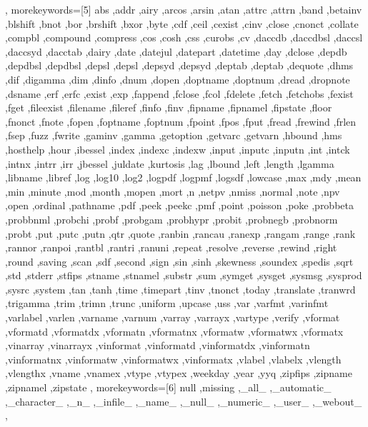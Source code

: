 {{  },
  morekeywords=[5]{
    abs ,addr ,airy ,arcos ,arsin ,atan ,attrc ,attrn ,band ,betainv
    ,blshift ,bnot ,bor ,brshift ,bxor ,byte ,cdf ,ceil ,cexist ,cinv
    ,close ,cnonct ,collate ,compbl ,compound ,compress ,cos ,cosh ,css
    ,curobs ,cv ,daccdb ,daccdbsl ,daccsl ,daccsyd ,dacctab ,dairy
    ,date ,datejul ,datepart ,datetime ,day ,dclose ,depdb ,depdbsl
    ,depdbsl ,depsl ,depsl ,depsyd ,depsyd ,deptab ,deptab ,dequote
    ,dhms ,dif ,digamma ,dim ,dinfo ,dnum ,dopen ,doptname ,doptnum
    ,dread ,dropnote ,dsname ,erf ,erfc ,exist ,exp ,fappend ,fclose
    ,fcol ,fdelete ,fetch ,fetchobs ,fexist ,fget ,fileexist ,filename
    ,fileref ,finfo ,finv ,fipname ,fipnamel ,fipstate ,floor ,fnonct
    ,fnote ,fopen ,foptname ,foptnum ,fpoint ,fpos ,fput ,fread ,frewind
    ,frlen ,fsep ,fuzz ,fwrite ,gaminv ,gamma ,getoption ,getvarc
    ,getvarn ,hbound ,hms ,hosthelp ,hour ,ibessel ,index ,indexc
    ,indexw ,input ,inputc ,inputn ,int ,intck ,intnx ,intrr ,irr
    ,jbessel ,juldate ,kurtosis ,lag ,lbound ,left ,length ,lgamma
    ,libname ,libref ,log ,log10 ,log2 ,logpdf ,logpmf ,logsdf ,lowcase
    ,max ,mdy ,mean ,min ,minute ,mod ,month ,mopen ,mort ,n ,netpv
    ,nmiss ,normal ,note ,npv ,open ,ordinal ,pathname ,pdf ,peek ,peekc
    ,pmf ,point ,poisson ,poke ,probbeta ,probbnml ,probchi ,probf
    ,probgam ,probhypr ,probit ,probnegb ,probnorm ,probt ,put ,putc
    ,putn ,qtr ,quote ,ranbin ,rancau ,ranexp ,rangam ,range ,rank
    ,rannor ,ranpoi ,rantbl ,rantri ,ranuni ,repeat ,resolve ,reverse
    ,rewind ,right ,round ,saving ,scan ,sdf ,second ,sign ,sin ,sinh
    ,skewness ,soundex ,spedis ,sqrt ,std ,stderr ,stfips ,stname
    ,stnamel ,substr ,sum ,symget ,sysget ,sysmsg ,sysprod ,sysrc
    ,system ,tan ,tanh ,time ,timepart ,tinv ,tnonct ,today ,translate
    ,tranwrd ,trigamma ,trim ,trimn ,trunc ,uniform ,upcase ,uss ,var
    ,varfmt ,varinfmt ,varlabel ,varlen ,varname ,varnum ,varray
    ,varrayx ,vartype ,verify ,vformat ,vformatd ,vformatdx ,vformatn
    ,vformatnx ,vformatw ,vformatwx ,vformatx ,vinarray ,vinarrayx
    ,vinformat ,vinformatd ,vinformatdx ,vinformatn ,vinformatnx
    ,vinformatw ,vinformatwx ,vinformatx ,vlabel ,vlabelx ,vlength
    ,vlengthx ,vname ,vnamex ,vtype ,vtypex ,weekday ,year ,yyq ,zipfips
    ,zipname ,zipnamel ,zipstate
  },
  morekeywords=[6]{
    null ,missing ,_all_ ,_automatic_ ,_character_ ,_n_ ,_infile_
    ,_name_ ,_null_ ,_numeric_ ,_user_ ,_webout_
  },
}


